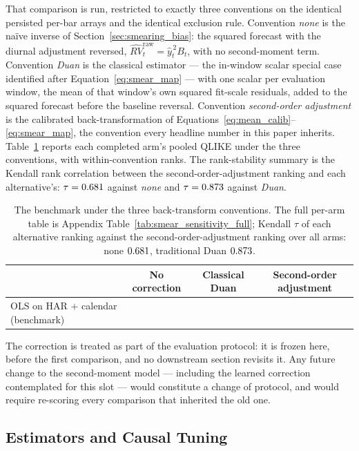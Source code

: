 That comparison is run, restricted to exactly three conventions on the
identical persisted per-bar arrays and the identical exclusion rule.
Convention \emph{none} is the na\"ive inverse of
Section~\ref{sec:smearing_bias}: the squared forecast with the diurnal
adjustment reversed, $\widehat{RV}_t^{\mathrm{raw}} = \hat{y}_t^{\,2} B_t$,
with no second-moment term. Convention \emph{Duan} is the classical \citet{Duan1983}
estimator --- the in-window scalar special case identified after
Equation~\eqref{eq:smear_map} --- with one scalar per evaluation window,
the mean of that window's own squared fit-scale residuals, added to the
squared forecast before the baseline reversal. Convention \emph{second-order adjustment}
is the calibrated back-transformation of
Equations~\eqref{eq:mean_calib}--\eqref{eq:smear_map}, the convention
every headline number in this paper inherits.
Table~\ref{tab:smear_sensitivity} reports each completed arm's pooled
QLIKE under the three conventions, with within-convention ranks. The
rank-stability summary is the Kendall rank correlation between the second-order-adjustment
ranking and each alternative's:
$\tau = 0.681$ against \emph{none} and
$\tau = 0.873$ against \emph{Duan}.

\begin{table}[H]
\centering
\caption{The benchmark under the three back-transform conventions. The
full per-arm table is Appendix Table~\ref{tab:smear_sensitivity_full};
Kendall $\tau$ of each alternative ranking against the second-order-adjustment ranking
over all arms: none $0.681$, traditional Duan
$0.873$.}
\label{tab:smear_sensitivity}
\begin{tabular}{@{}lccc@{}}
\toprule
 & No correction & Classical Duan & Second-order adjustment \\
\midrule
OLS on HAR $+$ calendar (benchmark) & \unifAzeroQLIKENone{} & \unifAzeroQLIKEDuan{} & \unifAzeroQLIKE{} \\
\bottomrule
\end{tabular}
\end{table}

The correction is treated as part of the evaluation protocol: it is frozen
here, before the first comparison, and no downstream section revisits it.
Any future change to the second-moment model --- including the learned
correction contemplated for this slot --- would constitute a change of
protocol, and would require re-scoring every comparison that inherited the
old one.

\subsection{Estimators and Causal Tuning}
\label{sec:estimators}

